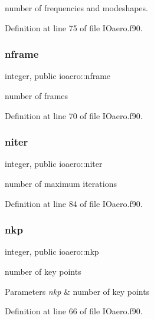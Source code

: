 number of frequencies and modeshapes. 



Definition at line 75 of file I\+Oaero.\+f90.

\mbox{\label{namespaceioaero_ac9fe2ddcc0797f81e7bc475a28692978}} 
\subsubsection{\texorpdfstring{nframe}{nframe}}
{\footnotesize\ttfamily integer, public ioaero\+::nframe}



number of frames 



Definition at line 70 of file I\+Oaero.\+f90.

\mbox{\label{namespaceioaero_ac008486fd12e0029a1ef77b3ca5e12c3}} 
\subsubsection{\texorpdfstring{niter}{niter}}
{\footnotesize\ttfamily integer, public ioaero\+::niter}



number of maximum iterations 



Definition at line 84 of file I\+Oaero.\+f90.

\mbox{\label{namespaceioaero_a24506866304c39bd1fa57ef73b124335}} 
\subsubsection{\texorpdfstring{nkp}{nkp}}
{\footnotesize\ttfamily integer, public ioaero\+::nkp}



number of key points 


\begin{DoxyParams}{Parameters}
{\em nkp} & number of key points \\
\hline
\end{DoxyParams}


Definition at line 66 of file I\+Oaero.\+f90.

